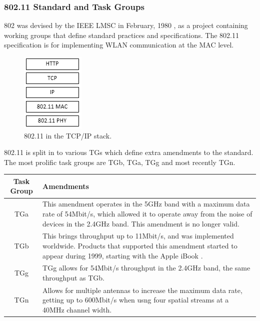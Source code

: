 \subsubsection{802.11 Standard and Task Groups}
802 was devised by the IEEE  LMSC in February, 1980 \cite{intro:ieee_decrypted}, as a project containing working groups that define standard practices and specifications. The 802.11 specification is for implementing WLAN  communication at the MAC  level. 

\begin{figure}[htb!]
	\centering\includegraphics{intro/diagrams/tcpip.png}
	\caption{802.11 in the TCP/IP   stack.}
\end{figure}

802.11 is split in to various TGs  which define extra amendments to the standard. The most prolific task groups are TGb, TGa, TGg and most recently TGn.

\begin{table}[htb!]
\begin{center}
	\begin{tabular}{| c | p{ 10cm } |}
		\hline
		\textbf{Task Group} & \textbf{Amendments} \\ \hline
		TGa & This amendment operates in the 5GHz band with a maximum data rate of 54Mbit/s, which allowed it to operate away from the noise of devices in the 2.4GHz band. This amendment is no longer valid. \\ \hline
		TGb & This brings throughput up to 11Mbit/s, and was implemented worldwide. Products that supported this amendment started to appear during 1999, starting with the Apple iBook \cite{intro:apple_ibook}. \\ \hline
		TGg & TGg allows for 54Mbit/s throughput in the 2.4GHz band, the same throughput as TGb. \\ \hline
		TGn & Allows for multiple antennas to increase the maximum data rate, getting up to 600Mbit/s when usng four spatial streams at a 40MHz channel width. \\ 
		\hline
	\end{tabular}
\end{center}
\end{table}
\clearpage
